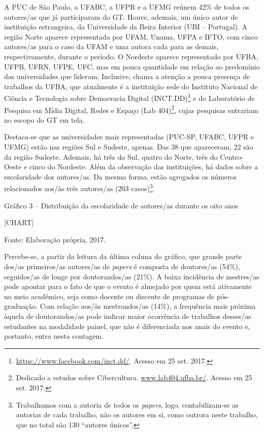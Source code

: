 A PUC de São Paulo, a UFABC, a UFPR e a UFMG reúnem 42\% de todos os
autores/as que já participaram do GT. Houve, ademais, um único autor de
instituição estrangeira, da Universidade da Beira Interior (UBI --
Portugal). A região Norte aparece representada por UFAM, Unama, UFPA e
IFTO, com cinco autores/as para o caso da UFAM e uma autora cada para as
demais, respectivamente, durante o período. O Nordeste aparece
representado por UFBA, UFPB, UFRN, UFPE, UFC, mas em pouca quantidade em
relação ao predomínio das universidades que lideram. Inclusive, chama a
atenção a pouca presença de trabalhos da UFBA, que atualmente é a
instituição sede do Instituto Nacional de Ciência e Tecnologia sobre
Democracia Digital (INCT.DD)\footnote{\url{https://www.facebook.com/inct.dd/}.
  Acesso em 25 set. 2017.} e do Laboratório de Pesquisa em Mídia
Digital, Redes e Espaço (Lab 404)\footnote{Dedicado a estudos sobre
  Cibercultura. \href{http://www.lab404.ufba.br/}{www.lab404.ufba.br/}.
  Acesso em 25 set. 2017.}, cujas pesquisas entrariam no escopo do GT em
tela.

Destaca-se que as universidades mais representadas (PUC-SP, UFABC, UFPR
e UFMG) estão nas regiões Sul e Sudeste, apenas. Das 38 que apareceram,
22 são da região Sudeste. Ademais, há três do Sul, quatro do Norte, três
do Centro-Oeste e cinco do Nordeste. Além da observação das
instituições, há dados sobre a escolaridade dos autores/as. Da mesma
forma, estão agregados os números relacionados aos/às três autores/as
(203 casos)\footnote{Trabalhamos com a autoria de todos os
  \emph{papers}, logo, contabilizam-se as autorias de cada trabalho, não
  os autores em si, como outrora neste trabalho, que no total são 130
  ``autores únicos''.}.

Gráfico 3 -- Distribuição da escolaridade de autores/as durante os oito
anos

{{[}CHART{]}}

Fonte: Elaboração própria, 2017.

Percebe-se, a partir da leitura da última coluna do gráfico, que grande
parte dos/as primeiros/as autores/as de \emph{papers} é composta de
doutores/as (54\%), seguidos/as de longe por doutorandos/as (21\%). A
baixa incidência de mestres/as pode apontar para o fato de que o evento
é almejado por quem está ativamente no meio acadêmico, seja como docente
ou discente de programas de pós-graduação. Com relação aos/às
mestrandos/as (14\%), a frequência mais próxima àquela de doutorandos/as
pode indicar maior ocorrência de trabalhos desses/as estudantes na
modalidade painel, que não é diferenciada nos anais do evento e,
portanto, entra nesta contagem.

